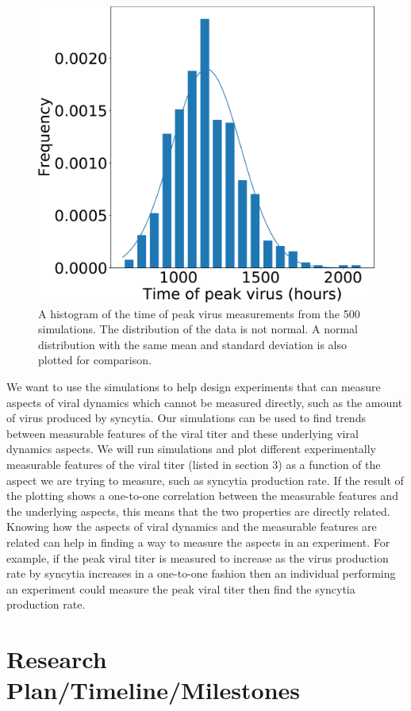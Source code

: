\documentclass[a4paper]{article}
\begin{document}
\begin{figure}[h]
    \centering
    \includegraphics[width=0.45\linewidth]{Figures/-50_TimeOfPeakHist.pdf}
    \caption{A histogram of the time of peak virus measurements from the 500 simulations.  The distribution of the data is not normal. A normal distribution with the same mean and standard deviation is also plotted for comparison.}
    \label{fig:Hist}
\end{figure}


We want to use the simulations to help design experiments that can measure aspects of viral dynamics which cannot be measured directly, such as the amount of virus produced by syncytia. Our simulations can be used to find trends between measurable features of the viral titer and these underlying viral dynamics aspects. We will run simulations and plot different experimentally measurable features of the viral titer (listed in section 3) as a function of the aspect we are trying to measure, such as syncytia production rate. If the result of the plotting shows a one-to-one correlation between the measurable features and the underlying aspects, this means that the two properties are directly related. Knowing how the aspects of viral dynamics and the measurable features are related can help in finding a way to measure the aspects in an experiment. For example, if the peak viral titer is measured to increase as the virus production rate by syncytia increases in a one-to-one fashion then an individual performing an experiment could measure the peak viral titer then find the syncytia production rate.

\section{Research Plan/Timeline/Milestones}
\end{document}

